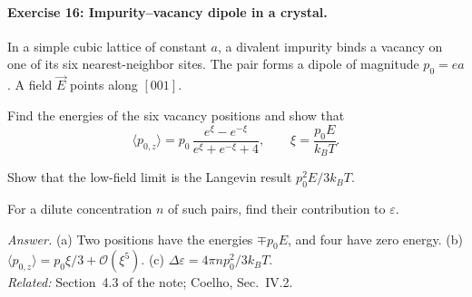 \documentclass[11pt]{article}      %
\numberwithin{equation}{section}   %
\begin{document}
\paragraph{Exercise 16: Impurity--vacancy dipole in a crystal.}
In a simple cubic lattice of constant $a$, a divalent impurity binds a vacancy on one of its six nearest-neighbor sites. The pair forms a dipole of magnitude $p_0 = ea$. A field $\vec E$ points along $[001]$.
\begin{parts}
    \item Find the energies of the six vacancy positions and show that
    \begin{equation*}
        \langle p_{0,z}\rangle = p_0\,\frac{e^{\xi} - e^{-\xi}}{e^{\xi} + e^{-\xi} + 4},
        \qquad \xi = \frac{p_0E}{k_BT}.
    \end{equation*}
    \item Show that the low-field limit is the Langevin result $p_0^2E/3k_BT$.
    \item For a dilute concentration $n$ of such pairs, find their contribution to $\varepsilon$.
\end{parts}
\textit{Answer.} (a) Two positions have the energies $\mp p_0E$, and four have zero energy. (b) $\langle p_{0,z}\rangle = p_0\xi/3 + \mathcal{O}(\xi^5)$. (c) $\Delta\varepsilon = 4\pi np_0^2/3k_BT$.\\
\textit{Related:} Section~4.3 of the note; Coelho, Sec.~IV.2.
\end{document}
